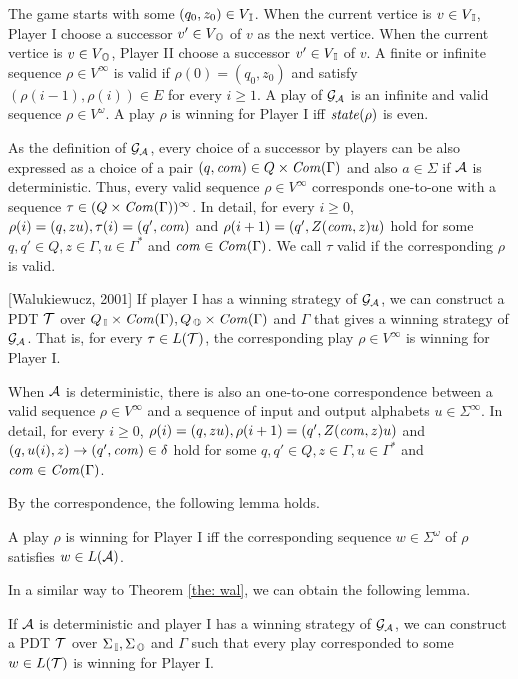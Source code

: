 The game starts with some $(q_0,z_0)\in V_{\, \mathbb{I}}$.
When the current vertice is $v\in V_{\, \mathbb{I}}$,
Player I choose a successor $v'\in V_{\, \mathbb{O}}$ of $v$ as the next vertice.
When the current vertice is $v\in V_{\, \mathbb{O}}$,
Player II choose a successor $v'\in V_{\, \mathbb{I}}$ of $v$.
A finite or infinite sequence $\rho\in V^\infty$ is valid if
$\rho(0)=(q_0,z_0)$ and satisfy
$(\rho(i-1), \rho(i))\in E$ for every $i\geq 1$.
A play of ${\cal G}_{\cal A}$ is an infinite and valid sequence $\rho\in V^\omega$.
A play $\rho$ is winning for Player I iff $\mathit{state}(\rho)$ is even.

As the definition of ${\cal G}_{\cal A}$,
every choice of a successor by players can be also expressed as
a choice of a pair $(q,\mathit{com})\in Q\times \mathit{Com}(\Gamma)$ and also $a\in\Sigma$ if ${\cal A}$ is deterministic.
Thus, every valid sequence $\rho \in V^\infty$
corresponds one-to-one with a sequence $\tau\in (Q\times \mathit{Com}(\Gamma))^\infty$.
In detail, for every $i\geq 0$, $\rho(i) = (q, zu), \tau(i) = (q', \mathit{com})$ and $\rho(i+1) = (q', Z(\mathit{com},z)u)$ hold for some $q, q'\in Q, z\in\Gamma, u\in\Gamma^*$ and $\mathit{com}\in \mathit{Com}(\Gamma)$.
We call $\tau$ valid if the corresponding $\rho$ is valid.

\begin{theorem}{[Walukiewucz, 2001]}
\label{the: wal}
If player I has a winning strategy of ${\cal G}_{\cal A}$,
we can construct a PDT ${\cal T}$ over $Q_{\, \mathbb{I}}\times\mathit{Com}(\Gamma), Q_{\, \mathbb{O}}\times\mathit{Com}(\Gamma)$ and $\Gamma$ that gives a winning strategy of ${\cal G}_{\cal A}$.
That is, for every $\tau\in L({\cal T})$, the corresponding play $\rho\in V^\infty$ is winning for Player I.
\end{theorem}

When ${\cal A}$ is deterministic,
there is also an one-to-one correspondence between
a valid sequence $\rho\in V^\infty$ and a sequence of input and output alphabets $u\in\Sigma^\infty$.
In detail, for every $i\geq 0$, $\rho(i) = (q, zu), \rho(i+1) = (q', Z(\mathit{com},z)u)$ and $(q, u(i), z) \to (q', \mathit{com})\in\delta$ hold for some $q, q'\in Q, z\in\Gamma, u\in\Gamma^*$ and $\mathit{com}\in \mathit{Com}(\Gamma)$.

By the correspondence, the following lemma holds.
\begin{lemma}
\label{lem: 1}
A play $\rho$ is winning for Player I iff
the corresponding sequence $w\in \Sigma^\omega$ of $\rho$
satisfies $w\in L({\cal A})$.
\end{lemma}

In a similar way to Theorem \ref{the: wal},
we can obtain the following lemma.
\begin{lemma}
\label{lem: 2}
If ${\cal A}$ is deterministic and player I has a winning strategy of ${\cal G}_{\cal A}$,
we can construct a PDT ${\cal T}$ over $\Sigma_{\, \mathbb{I}}, \Sigma_{\, \mathbb{O}}$ and $\Gamma$
such that every play corresponded to some $w\in L({\cal T})$ is winning for Player I.
\end{lemma}

